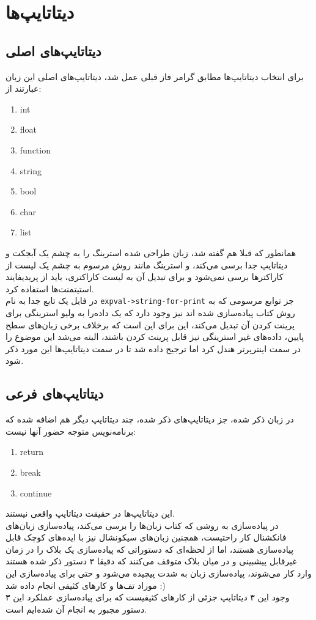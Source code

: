 \documentclass{article}
\begin{document}
\section{دیتا‌تایپ‌ها}
\subsection{دیتاتایپ‌های اصلی}
برای انتخاب دیتا‌تایپ‌ها مطابق گرامر فاز قبلی عمل شد، دیتا‌تایپ‌های اصلی این زبان عبارتند از:
\begin{enumerate}
        \item int
        \item float 
        \item function 
        \item string
        \item bool 
        \item char
        \item list
\end{enumerate}
همانطور که قبلا هم گفته شد، زبان طراحی شده استرینگ را به چشم یک آبجکت و دیتاتایپ جدا برسی می‌کند، و استرینگ مانند روش مرسوم به چشم یک لیست از 
کاراکتر‌ها 
برسی نمی‌شود و برای تبدیل آن به لیست کاراکتری، باید از پریدیفایند استیتمنت‌ها استفاده کرد.
\\
در فایل
یک تابع جدا به نام 
\texttt{expval->string-for-print}
جز توابع مرسومی که به روش کتاب پیاده‌سازی شده اند نیز وجود دارد که یک داده‌را به ولیو استرینگی برای پرینت کردن آن تبدیل می‌کند، 
این برای این است که برخلاف برخی زبان‌های سطح پایین، داده‌های غیر استرینگی نیز قابل پرینت کردن باشند، البته می‌شد این موضوع را در سمت اینترپرتر هندل کرد اما ترجیح داده شد تا 
در سمت دیتاتایپ‌ها این مورد ذکر شود.
\subsection{دیتا‌تایپ‌های فرعی}
در زبان ذکر شده، جز دیتاتایپ‌های ذکر شده، چند دیتاتایپ دیگر هم اضافه شده که برنامه‌نویس متوجه حضور آنها نیست:
\begin{enumerate}
        \item return 
        \item break 
        \item continue
\end{enumerate}
این دیتاتایپ‌ها در حقیقت دیتاتایپ واقعی نیستند.
\\
در پیاده‌سازی به روشی که کتاب زبان‌ها را برسی می‌کند، پیاده‌سازی زبان‌های فانکشنال کار راحتیست، همچنین زبان‌های سیکونشال نیز 
با ایده‌های کوچک قابل پیاده‌سازی هستند، اما از لحظه‌ای که دستوراتی که پیاده‌سازی یک بلاک را در زمان غیرقابل پیشبینی و در میان بلاک متوقف می‌کنند
که دقیقا ۳ دستور ذکر شده هستند وارد کار می‌شوند، پیاده‌سازی زبان به شدت پیچیده‌ می‌شود و حتی برای پیاده‌سازی این موراد تف‌ها و کار‌های کثیفی انجام داده شد :)
\\
وجود این ۳ دیتاتایپ جزئی از کار‌های کثیفیست که برای پیاده‌سازی عملکرد این ۳ دستور مجبور به انجام آن شده‌ایم است.
\end{document}
